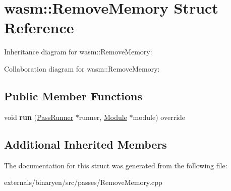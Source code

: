 \hypertarget{structwasm_1_1_remove_memory}{}\section{wasm\+:\+:Remove\+Memory Struct Reference}
\label{structwasm_1_1_remove_memory}


Inheritance diagram for wasm\+:\+:Remove\+Memory\+:


Collaboration diagram for wasm\+:\+:Remove\+Memory\+:
\subsection*{Public Member Functions}
\begin{DoxyCompactItemize}
\item 
\mbox{\label{structwasm_1_1_remove_memory_aebdc06f5372a544d47e5ad4ee7e5f7c1}} 
void {\bfseries run} (\mbox{\hyperlink{structwasm_1_1_pass_runner}{Pass\+Runner}} $\ast$runner, \mbox{\hyperlink{classwasm_1_1_module}{Module}} $\ast$module) override
\end{DoxyCompactItemize}
\subsection*{Additional Inherited Members}


The documentation for this struct was generated from the following file\+:\begin{DoxyCompactItemize}
\item 
externals/binaryen/src/passes/Remove\+Memory.\+cpp\end{DoxyCompactItemize}
